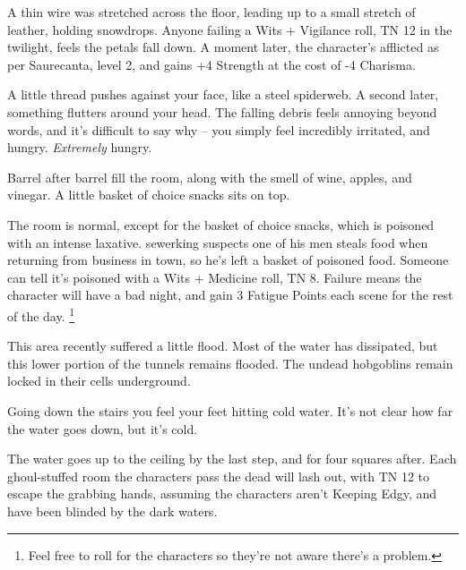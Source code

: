 \begin{multicols}{2}
A thin wire was stretched across the floor, leading up to a small stretch of leather, holding snowdrops.  Anyone failing a Wits + Vigilance roll, TN 12 in the twilight, feels the petals fall down.  A moment later, the character's afflicted as per Saurecanta, level 2, and gains +4 Strength at the cost of -4 Charisma.

\begin{boxtext}

  A little thread pushes against your face, like a steel spiderweb.
  A second later, something flutters around your head.
  The falling debris feels annoying beyond words, and it's difficult to say why -- you simply feel incredibly irritated, and hungry.
  \emph{Extremely} hungry.

\end{boxtext}


\begin{boxtext}

  Barrel after barrel fill the room, along with the smell of wine, apples, and vinegar.  A little basket of choice snacks sits on top.

\end{boxtext}

The room is normal, except for the basket of choice snacks, which is poisoned with an intense laxative.
\Gls{sewerking} suspects one of his men steals food when returning from business in \gls{town}, so he's left a basket of poisoned food.
Someone can tell it's poisoned with a Wits + Medicine roll, TN 8.
Failure means the character will have a bad night, and gain 3 Fatigue Points each scene for the rest of the day.%
\footnote{Feel free to roll for the characters so they're not aware there's a problem.}


This area recently suffered a little flood.  Most of the water has dissipated, but this lower portion of the tunnels remains flooded.  The undead hobgoblins remain locked in their cells underground.


\begin{boxtext}
  Going down the stairs you feel your feet hitting cold water.  It's not clear how far the water goes down, but it's cold.
\end{boxtext}

The water goes up to the ceiling by the last step, and for four squares after.  Each ghoul-stuffed room the characters pass the dead will lash out, with TN 12 to escape the grabbing hands, assuming the characters aren't Keeping Edgy, and have been blinded by the dark waters.


\end{multicols}
